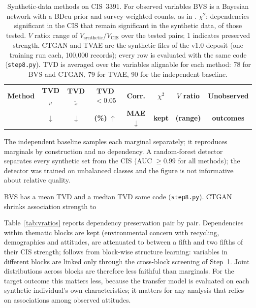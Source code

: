 \begin{table}[htbp]
\centering
\caption{Synthetic-data methods on CIS~3391. For
observed variables BVS is a Bayesian network with a BDeu prior and
survey-weighted counts, as in \citet{martins2024}. $\chi^2$: dependencies significant in the CIS that remain
significant in the synthetic data, of those tested. $V$ ratio: range of
$V_{\mathrm{synthetic}} / V_{\mathrm{CIS}}$ over the tested pairs; 1 indicates
preserved strength. CTGAN and TVAE are the synthetic files of the v1.0 deposit
(one training run each, 100{,}000 records); every row is evaluated with the same
code (\texttt{step8.py}). TVD is averaged over the variables alignable for each
method: 78 for BVS and CTGAN, 79 for TVAE, 90 for the independent baseline.}
\label{tab:comparison}
\small
\begin{threeparttable}
\begin{tabular}{lccccccc}
\toprule
\textbf{Method} & \textbf{TVD}$_\mu$ & \textbf{TVD}$_{\tilde x}$ &
  \textbf{TVD${<}0.05$} & \textbf{Corr.} & $\chi^2$ & \textbf{$V$ ratio} &
  \textbf{Unobserved} \\
 & $\downarrow$ & $\downarrow$ & \textbf{(\%)} $\uparrow$ &
  \textbf{MAE} $\downarrow$ & \textbf{kept} & \textbf{(range)} &
  \textbf{outcomes} \\
\midrule
\bottomrule
\end{tabular}
\begin{tablenotes}\small
\item The independent baseline samples each marginal separately; it reproduces
  marginals by construction and no dependency. A random-forest detector
  separates every synthetic set from the CIS (AUC $\geq 0.99$ for all
  methods); the detector was trained on unbalanced classes and the figure is
  not informative about relative quality.
\end{tablenotes}
\end{threeparttable}
\end{table}

BVS has a mean TVD %
and a median TVD %
same code (\texttt{step8.py}). CTGAN shrinks association strength to

Table~\ref{tab:vratios} reports dependency preservation pair by pair.
Dependencies within thematic blocks are kept (environmental concern with
recycling, %
demographics and attitudes, are attenuated to between a fifth and two fifths of
their CIS strength; %
follows from block-wise structure learning: variables in different blocks are
linked only through the cross-block screening of Step~1. Joint distributions
across blocks are therefore less faithful than marginals. For the target
outcome this matters less, because the transfer model is evaluated on each
synthetic individual's own characteristics; it matters for any analysis that
relies on associations among observed attitudes. %


